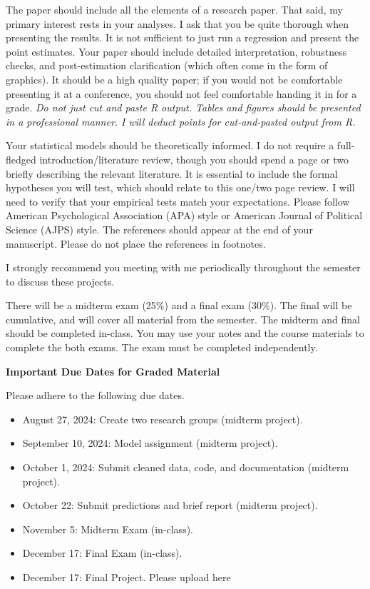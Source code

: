 \documentclass[
]{book}
\begin{document}
The paper should include all the elements of a research paper. That said, my primary interest rests in your analyses. I ask that you be quite thorough when presenting the results. It is not sufficient to just run a regression and present the point estimates. Your paper should include detailed interpretation, robustness checks, and post-estimation clarification (which often come in the form of graphics). It should be a high quality paper; if you would not be comfortable presenting it at a conference, you should not feel comfortable handing it in for a grade. \emph{Do not just cut and paste R output. Tables and figures should be presented in a professional manner. I will deduct points for cut-and-pasted output from R.}

Your statistical models should be theoretically informed. I do not require a full-fledged introduction/literature review, though you should spend a page or two briefly describing the relevant literature. It is essential to include the formal hypotheses you will test, which should relate to this one/two page review. I will need to verify that your empirical tests match your expectations. Please follow American Psychological Association (APA) style or American Journal of Political Science (AJPS) style. The references should appear at the end of your manuscript. Please do not place the references in footnotes.

I strongly recommend you meeting with me periodically throughout the semester to discuss these projects.

There will be a midterm exam (25\%) and a final exam (30\%). The final will be cumulative, and will cover all material from the semester. The midterm and final should be completed in-class. You may use your notes and the course materials to complete the both exams. The exam must be completed independently.

\textbf{Important Due Dates for Graded Material}

Please adhere to the following due dates.

\begin{itemize}
\item
  August 27, 2024: Create two research groups (midterm project).
\item
  September 10, 2024: Model assignment (midterm project).
\item
  October 1, 2024: Submit cleaned data, code, and documentation (midterm project).
\item
  October 22: Submit predictions and brief report (midterm project).
\item
  November 5: Midterm Exam (in-class).
\item
  December 17: Final Exam (in-class).
\item
  December 17: Final Project. Please upload here
\end{itemize}
\end{document}
